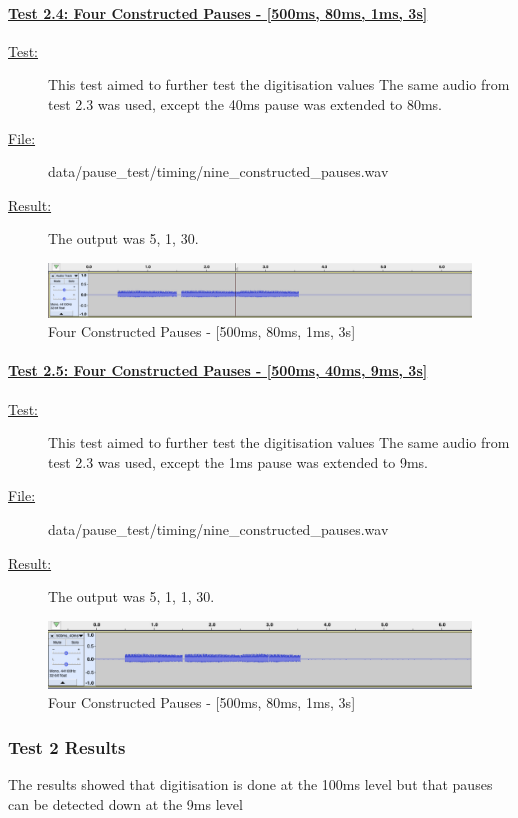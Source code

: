 \paragraph{\underline{Test 2.4: Four Constructed Pauses - [500ms, 80ms, 1ms, 3s]}}
\begin{description}
	\item[\underline{Test:}] This test aimed to further test the digitisation values
						The same audio from test 2.3 was used, except the 40ms pause was extended to 80ms.
	\item[\underline{File:}] data/pause\_test/timing/nine\_constructed\_pauses.wav
	\item[\underline{Result:}] The output was 5, 1, 30.
\end{description}
\begin{figure}[h]
	\center
	\includegraphics[scale=0.3]{src/main-matter/results/preliminary-testing/detection/500ms_80ms_1ms_3s}
	\caption{Four Constructed Pauses - [500ms, 80ms, 1ms, 3s]}
	\label{fig:023}
\end{figure}

\paragraph{\underline{Test 2.5: Four Constructed Pauses - [500ms, 40ms, 9ms, 3s]}}
\begin{description}
	\item[\underline{Test:}] This test aimed to further test the digitisation values
						The same audio from test 2.3 was used, except the 1ms pause was extended to 9ms.
	\item[\underline{File:}] data/pause\_test/timing/nine\_constructed\_pauses.wav
	\item[\underline{Result:}] The output was 5, 1, 1, 30.
\end{description}
\begin{figure}[h]
	\center
	\includegraphics[scale=0.3]{src/main-matter/results/preliminary-testing/detection/500ms_40ms_9ms_3s}
	\caption{Four Constructed Pauses - [500ms, 80ms, 1ms, 3s]}
	\label{fig:023}
\end{figure}

\subsubsection{Test 2 Results}
The results showed that digitisation is done at the 100ms level but that pauses can be detected down at the 9ms level